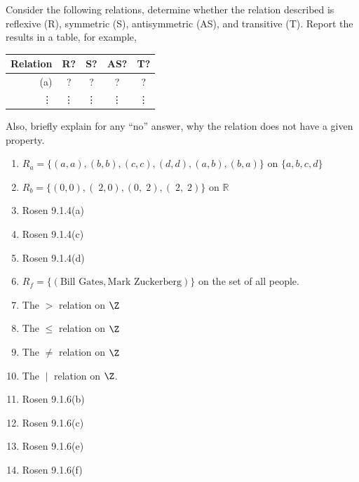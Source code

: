 \begin{questions}
 Consider the following relations, determine whether the relation described is reflexive (R), symmetric (S), antisymmetric (AS), and transitive (T).  Report the results in a table, for example, 

\begin{tabular}{|r|cccc|}
	\hline 
		\textbf{Relation} & \textbf{R?} & \textbf{S?} & \textbf{AS?} & \textbf{T?} \\
	\hline 
		(a)  &  ? & ? & ? &  ? \\
		\vdots & \vdots & \vdots & \vdots & \vdots \\	
	\hline 
\end{tabular}

Also, briefly explain for any ``no'' answer, why the relation does not have a given property. 

\begin{enumerate}[label=(\alph*),itemsep=0pt,parsep=0pt,topsep=0pt,partopsep=0pt]
	\item $R_a = \{ (a,a),(b,b),(c,c),(d,d),(a,b),(b,a) \}$ on $\{a, b, c, d\}$
	\item $R_b = \{ (0, 0), (􏰁2, 0), (0, 􏰁2), (􏰁2, 􏰁2) \}$ on $\mathbb{R}$ 
	\item Rosen 9.1.4(a) %
	\item Rosen 9.1.4(c) 
	\item Rosen 9.1.4(d) 
	\item $R_f = \{ (\text{Bill Gates}, \text{Mark Zuckerberg}) \}$ on the set of all people.
	\item The $>$ relation on $\Z$ 
	\item The $\leq$ relation on $\Z$ 
	\item The $\neq$ relation on $\Z$ 
	\item The $\;|\;$ relation on $\Z$. 
	\item Rosen 9.1.6(b)
	\item Rosen 9.1.6(c)
	\item Rosen 9.1.6(e) 
	\item Rosen 9.1.6(f) 
\end{enumerate}


\end{questions}

